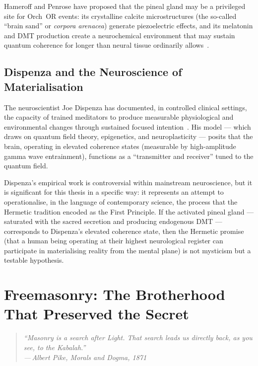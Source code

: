 \documentclass[12pt, a4paper]{article}
\newcommand{\epigraph}[2]{%
  \begin{quote}
    \itshape ``#1''\\[0.3em]
    \normalfont\small\hfill ---\,#2
  \end{quote}
}
\begin{document}
Hameroff and Penrose have proposed that the pineal gland may be a
privileged site for Orch~OR events: its crystalline calcite microstructures
(the so-called ``brain sand'' or \emph{corpora arenacea}) generate
piezoelectric effects, and its melatonin and DMT production create a
neurochemical environment that may sustain quantum coherence for longer than
neural tissue ordinarily
allows~\autocite[56]{hameroff2014}.

\subsection{Dispenza and the Neuroscience of Materialisation}

The neuroscientist Joe Dispenza has documented, in controlled clinical settings,
the capacity of trained meditators to produce measurable physiological and
environmental changes through sustained focused intention~\autocite{dispenza2017}.
His model — which draws on quantum field theory, epigenetics, and
neuroplasticity — posits that the brain, operating in elevated coherence states
(measurable by high-amplitude gamma wave entrainment), functions as a
``transmitter and receiver'' tuned to the quantum field.

Dispenza's empirical work is controversial within mainstream neuroscience, but
it is significant for this thesis in a specific way: it represents an attempt
to operationalise, in the language of contemporary science, the process that
the Hermetic tradition encoded as the First Principle. If the activated pineal
gland — saturated with the sacred secretion and producing endogenous DMT —
corresponds to Dispenza's elevated coherence state, then the Hermetic promise
(that a human being operating at their highest neurological register can
participate in materialising reality from the mental plane) is not mysticism
but a testable hypothesis.

\section{Freemasonry: The Brotherhood That Preserved the Secret}
\label{sec:freemasonry}

\epigraph{Masonry is a search after Light. That search leads us directly back,
as you see, to the Kabalah.}{Albert Pike, \emph{Morals and Dogma}, 1871}
\end{document}
